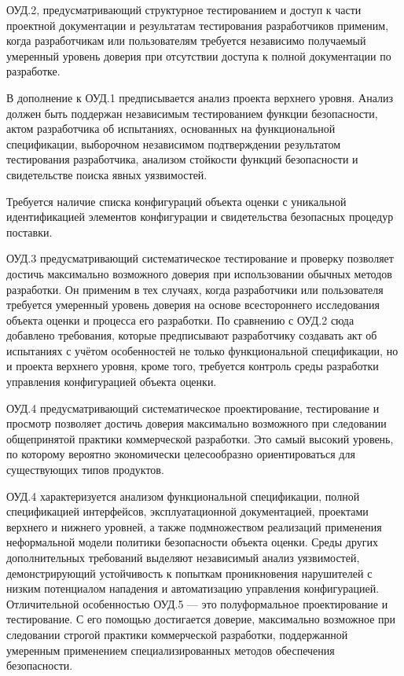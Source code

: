 \documentclass[12pt, russian, oneside, article]{ncc}
\begin{document}
ОУД.2, предусматривающий структурное тестированием и доступ к части проектной документации и результатам тестирования разработчиков применим, когда разработчикам или пользователям требуется независимо получаемый умеренный уровень доверия при отсутствии доступа к полной документации по разработке. 

В дополнение к ОУД.1 предписывается анализ проекта верхнего уровня. Анализ должен быть поддержан независимым тестированием функции безопасности, актом разработчика об испытаниях, основанных на функциональной спецификации, выборочном независимом подтверждении результатом тестирования разработчика, анализом стойкости функций безопасности и свидетельстве поиска явных уязвимостей.

Требуется наличие списка конфигураций объекта оценки с уникальной идентификацией элементов конфигурации и свидетельства безопасных процедур поставки.

ОУД.3 предусматривающий систематическое тестирование и проверку позволяет достичь максимально возможного доверия при использовании обычных методов разработки. Он применим в тех случаях, когда разработчики или пользователя требуется умеренный уровень доверия на основе всестороннего исследования объекта оценки и процесса его разработки. По сравнению с ОУД.2 сюда добавлено требования, которые предписывают разработчику создавать акт об испытаниях с учётом особенностей не только функциональной спецификации, но и проекта верхнего уровня, кроме того, требуется контроль среды разработки управления конфигурацией объекта оценки.

ОУД.4 предусматривающий систематическое проектирование, тестирование и просмотр позволяет достичь доверия максимально возможного при следовании общепринятой практики коммерческой разработки. Это самый высокий уровень, по которому вероятно экономически целесообразно ориентироваться для существующих типов продуктов.

ОУД.4 характеризуется анализом функциональной спецификации, полной спецификацией интерфейсов, эксплуатационной документацией, проектами верхнего и нижнего уровней, а также подмножеством реализаций применения неформальной модели политики безопасности объекта оценки. Среды других дополнительных требований выделяют независимый анализ уязвимостей, демонстрирующий устойчивость к попыткам проникновения нарушителей с низким потенциалом нападения и автоматизацию управления конфигурацией. Отличительной особенностью ОУД.5 --- это полуформальное проектирование и тестирование. С его помощью достигается доверие, максимально возможное при следовании строгой практики коммерческой разработки, поддержанной умеренным применением специализированных методов обеспечения безопасности.
\end{document}
